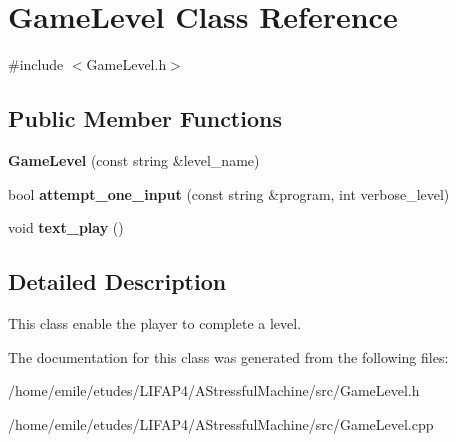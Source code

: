 \hypertarget{classGameLevel}{}\section{Game\+Level Class Reference}
\label{classGameLevel}


{\ttfamily \#include $<$Game\+Level.\+h$>$}

\subsection*{Public Member Functions}
\begin{DoxyCompactItemize}
\item 
\mbox{\label{classGameLevel_ac990c08a5a5b4956537f88d4fdec23eb}} 
{\bfseries Game\+Level} (const string \&level\+\_\+name)
\item 
\mbox{\label{classGameLevel_aa928baf15eb4990f298e480e8d5aa0d4}} 
bool {\bfseries attempt\+\_\+one\+\_\+input} (const string \&program, int verbose\+\_\+level)
\item 
\mbox{\label{classGameLevel_a449dc82f9d558ea2598d9a00a772b0db}} 
void {\bfseries text\+\_\+play} ()
\end{DoxyCompactItemize}


\subsection{Detailed Description}
This class enable the player to complete a level. 

The documentation for this class was generated from the following files\+:\begin{DoxyCompactItemize}
\item 
/home/emile/etudes/\+L\+I\+F\+A\+P4/\+A\+Stressful\+Machine/src/Game\+Level.\+h\item 
/home/emile/etudes/\+L\+I\+F\+A\+P4/\+A\+Stressful\+Machine/src/Game\+Level.\+cpp\end{DoxyCompactItemize}
